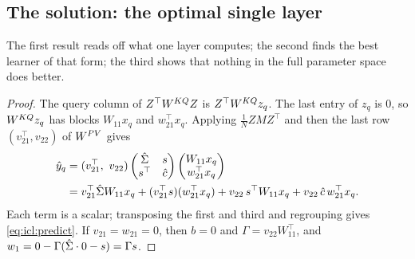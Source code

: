 \begin{refsection}
\section{The solution: the optimal single layer}\label{sec:icl:solution}

The first result reads off what one layer computes; the second finds the best learner of that form; the third shows that nothing in the full parameter space does better.


\begin{proof}
The query column of $Z^\top W^{KQ} Z$ is $Z^\top W^{KQ} z_q$. The last entry of $z_q$ is $0$, so $W^{KQ} z_q$ has blocks $W_{11}x_q$ and $w_{21}^\top x_q$. Applying $\frac1NZMZ^\top$ and then the last row $(v_{21}^\top,v_{22})$ of $W^{PV}$ gives
\begin{align*}
  \hat y_q&=(v_{21}^\top,\ v_{22})\begin{pmatrix}\hat\Sigma&s\\ s^\top&\hat c\end{pmatrix}\begin{pmatrix}W_{11}x_q\\ w_{21}^\top x_q\end{pmatrix}\\
  &=v_{21}^\top\hat\Sigma W_{11}x_q+(v_{21}^\top s)(w_{21}^\top x_q)+v_{22}\,s^\top W_{11}x_q+v_{22}\,\hat c\,w_{21}^\top x_q .
\end{align*}
Each term is a scalar; transposing the first and third and regrouping gives \eqref{eq:icl:predict}. If $v_{21}=w_{21}=0$, then $b=0$ and $\Gamma=v_{22}W_{11}^\top$, and $w_1=0-\Gamma(\hat\Sigma\cdot0-s)=\Gamma s$.
\end{proof}


\end{refsection}
